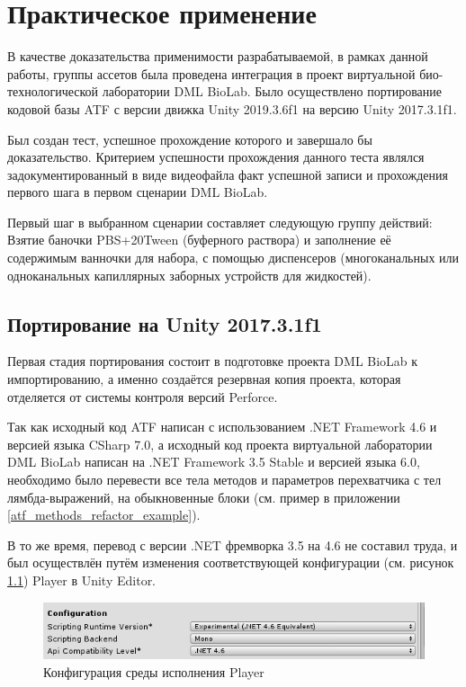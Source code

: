 \chapter{Практическое применение}
В качестве доказательства применимости разрабатываемой, в рамках данной работы, группы ассетов была проведена интеграция в проект виртуальной био-технологической лаборатории DML BioLab. Было осуществлено портирование кодовой базы ATF с версии движка Unity 2019.3.6f1 на версию Unity 2017.3.1f1. 

Был создан тест, успешное прохождение которого и завершало бы доказательство. Критерием успешности прохождения данного теста являлся задокументированный в виде видеофайла факт успешной записи и прохождения первого шага в первом сценарии DML BioLab.

Первый шаг в выбранном сценарии составляет следующую группу действий: Взятие баночки PBS+20Tween (буферного раствора) и заполнение её содержимым ванночки для набора, с помощью диспенсеров (многоканальных или одноканальных капиллярных заборных устройств для жидкостей). 

\section{Портирование на Unity 2017.3.1f1}
Первая стадия портирования состоит в подготовке проекта DML BioLab к импортированию, а именно создаётся резервная копия проекта, которая отделяется от системы контроля версий  Perforce.

Так как исходный код ATF написан с использованием .NET Framework 4.6 и версией языка CSharp 7.0, а исходный код проекта виртуальной лаборатории DML BioLab написан на .NET Framework 3.5 Stable и версией языка 6.0, необходимо было перевести все тела методов и параметров перехватчика с тел лямбда-выражений, на обыкновенные блоки (см. пример в приложении \ref{atf_methods_refactor_example}).

В то же время, перевод с версии .NET фремворка 3.5 на 4.6 не составил труда, и был осуществлён путём изменения соответствующей конфигурации (см. рисунок \ref{player_conf}) Player в Unity Editor.

\begin{figure}[H]
	\centering
	\includegraphics[width=\linewidth]{player_config.png}
	\caption{Конфигурация среды исполнения Player}
	\label{player_conf}
\end{figure}

